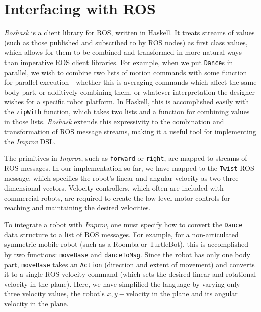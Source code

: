 \documentclass[sigchi-a]{acmart}
\begin{document}
\section{Interfacing with ROS}\label{interfacing-with-ros}

\emph{Roshask} is a client library for ROS, written in Haskell. It treats streams of values (such as those published
and subscribed to by ROS nodes) as first class values, which allows for them to
be combined and transformed in more natural ways than imperative ROS client
libraries. For example, when we put \texttt{Dance}s in parallel, we wish to combine two
lists of motion commands with some function for parallel execution - whether this
is averaging commands which affect the same body part, or additively combining
them, or whatever interpretation the designer wishes for a specific robot
platform. In Haskell, this is accomplished easily with the
\texttt{zipWith} function, which takes two lists and a function for combining values in
those lists. \emph{Roshask} extends this expressivity to the combination and
transformation of ROS message streams, making it a useful tool for implementing
the \emph{Improv} DSL.

The primitives in \emph{Improv}, such as \texttt{forward} or \texttt{right}, are
mapped to streams of ROS messages. In our implementation so far, we have mapped
to the \texttt{Twist} ROS message, which specifies the robot's linear and
angular velocity as two three-dimensional vectors. Velocity controllers, which
often are included with commercial robots, are required to create the low-level
motor controls for reaching and maintaining the desired velocities. 

To integrate a robot with \emph{Improv}, one must
specify how to convert the \texttt{Dance} data structure to a list of ROS
messages. For example, for a non-articulated symmetric mobile robot (such as a Roomba or
TurtleBot), this is accomplished by two functions: \texttt{moveBase} and
\texttt{danceToMsg}. Since the robot has only one body part, \texttt{moveBase}
takes an \texttt{Action} (direction and extent of movement) and converts it to a
single ROS velocity command (which sets the desired linear and rotational
velocity in the plane). 
Here, we have simplified the language
by varying only three velocity values, the robot's \(x,y-\)velocity in
the plane and its angular velocity in the plane.
\end{document}

